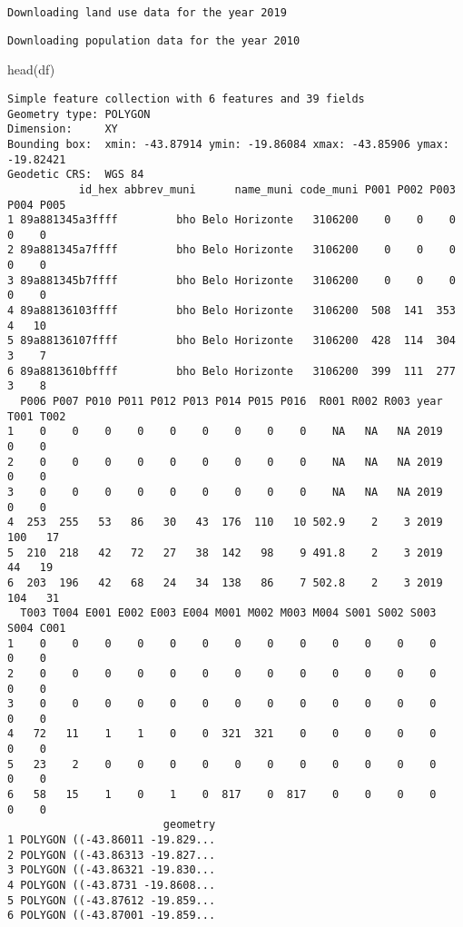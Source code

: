 \documentclass[
  letterpaper,
  DIV=11,
  numbers=noendperiod]{scrreprt}
\newenvironment{Shaded}{\begin{snugshade}}{\end{snugshade}}
\newcommand{\FunctionTok}[1]{\textcolor[rgb]{0.28,0.35,0.67}{#1}}
\newcommand{\NormalTok}[1]{\textcolor[rgb]{0.00,0.23,0.31}{#1}}
\begin{document}
\begin{verbatim}
Downloading land use data for the year 2019
\end{verbatim}

\begin{verbatim}
Downloading population data for the year 2010
\end{verbatim}

\begin{Shaded}
\begin{Highlighting}[]
\FunctionTok{head}\NormalTok{(df)}
\end{Highlighting}
\end{Shaded}

\begin{verbatim}
Simple feature collection with 6 features and 39 fields
Geometry type: POLYGON
Dimension:     XY
Bounding box:  xmin: -43.87914 ymin: -19.86084 xmax: -43.85906 ymax: -19.82421
Geodetic CRS:  WGS 84
           id_hex abbrev_muni      name_muni code_muni P001 P002 P003 P004 P005
1 89a881345a3ffff         bho Belo Horizonte   3106200    0    0    0    0    0
2 89a881345a7ffff         bho Belo Horizonte   3106200    0    0    0    0    0
3 89a881345b7ffff         bho Belo Horizonte   3106200    0    0    0    0    0
4 89a88136103ffff         bho Belo Horizonte   3106200  508  141  353    4   10
5 89a88136107ffff         bho Belo Horizonte   3106200  428  114  304    3    7
6 89a8813610bffff         bho Belo Horizonte   3106200  399  111  277    3    8
  P006 P007 P010 P011 P012 P013 P014 P015 P016  R001 R002 R003 year T001 T002
1    0    0    0    0    0    0    0    0    0    NA   NA   NA 2019    0    0
2    0    0    0    0    0    0    0    0    0    NA   NA   NA 2019    0    0
3    0    0    0    0    0    0    0    0    0    NA   NA   NA 2019    0    0
4  253  255   53   86   30   43  176  110   10 502.9    2    3 2019  100   17
5  210  218   42   72   27   38  142   98    9 491.8    2    3 2019   44   19
6  203  196   42   68   24   34  138   86    7 502.8    2    3 2019  104   31
  T003 T004 E001 E002 E003 E004 M001 M002 M003 M004 S001 S002 S003 S004 C001
1    0    0    0    0    0    0    0    0    0    0    0    0    0    0    0
2    0    0    0    0    0    0    0    0    0    0    0    0    0    0    0
3    0    0    0    0    0    0    0    0    0    0    0    0    0    0    0
4   72   11    1    1    0    0  321  321    0    0    0    0    0    0    0
5   23    2    0    0    0    0    0    0    0    0    0    0    0    0    0
6   58   15    1    0    1    0  817    0  817    0    0    0    0    0    0
                        geometry
1 POLYGON ((-43.86011 -19.829...
2 POLYGON ((-43.86313 -19.827...
3 POLYGON ((-43.86321 -19.830...
4 POLYGON ((-43.8731 -19.8608...
5 POLYGON ((-43.87612 -19.859...
6 POLYGON ((-43.87001 -19.859...
\end{verbatim}
\end{document}
